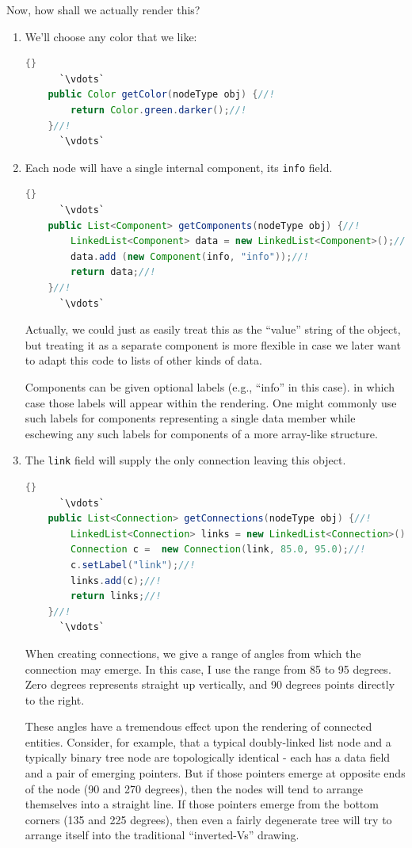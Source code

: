\documentclass[11pt,titlepage]{book}
\begin{document}
Now, how shall we actually render this?  
\begin{enumerate}
\item We'll choose any color that we like:
\begin{lstlisting}[language=Java,frame=tb]{}
      `\vdots`
    public Color getColor(nodeType obj) {//!
        return Color.green.darker();//!
    }//!
      `\vdots`
\end{lstlisting}

\item Each node will have a single internal component, its \texttt{info} field.
\begin{lstlisting}[language=Java,frame=tb]{}
      `\vdots`
    public List<Component> getComponents(nodeType obj) {//!
        LinkedList<Component> data = new LinkedList<Component>();//!
        data.add (new Component(info, "info"));//!
        return data;//!
    }//!
      `\vdots`
\end{lstlisting}
Actually, we could just as easily treat this as the ``value'' string
of the object, but treating it as a separate component is more
flexible in case we later want to adapt this code to lists of other
kinds of data.

Components can be given optional labels (e.g., ``info'' in this
case). in which case those labels will appear within the
rendering. One might commonly use such labels for components
representing a single data member while eschewing any such labels for
components of a more array-like structure.


\item The \texttt{link} field will supply the only connection 
leaving this object.
\begin{lstlisting}[language=Java,frame=tb]{}
      `\vdots`
    public List<Connection> getConnections(nodeType obj) {//!
        LinkedList<Connection> links = new LinkedList<Connection>();//!
        Connection c =  new Connection(link, 85.0, 95.0);//!
        c.setLabel("link");//!
        links.add(c);//!
        return links;//!
    }//!
      `\vdots`
\end{lstlisting}
When creating connections, we give a range of angles from which the
connection may emerge. In this case, I use the range from 85 to 95
degrees. Zero degrees represents straight up vertically, and 90
degrees points directly to the right.

These angles have a tremendous effect upon the rendering of connected
entities. Consider, for example, that a typical doubly-linked list
node and a typically binary tree node are topologically identical -
each has a data field and a pair of emerging pointers. But if those
pointers emerge at opposite ends of the node (90 and 270 degrees),
then the nodes will tend to arrange themselves into a straight
line. If those pointers emerge from the bottom corners (135 and 225
degrees), then even a fairly degenerate tree will try to arrange itself
into the traditional ``inverted-Vs'' drawing.


\end{enumerate}
\end{document}

